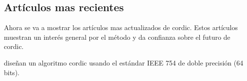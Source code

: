 \begin{table}[]
	\centering
	\caption{Tabla de comparaciones del \gls{cordic} propuesto con otros trabajos parecidos. Tabla de \cite{nguyen_low-resource_2015}}
\label{graf:2015_low-latency-fp}
\end{table}


\subsection{Artículos mas recientes}
Ahora se va a mostrar los artículos mas actualizados de \gls{cordic}. Estos artículos muestran un interés general por el método y da confianza sobre el futuro de \gls{cordic}.

\cite{hou_low_2019} diseñan un algoritmo \gls{cordic} usando el estándar IEEE 754 de doble precisión (64 bits).

